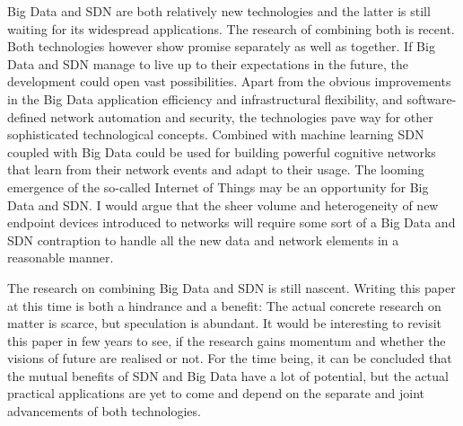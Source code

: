 \documentclass{acm_proc_article-sp}
\begin{document}
Big Data and SDN are both relatively new technologies and the latter is still waiting for its widespread applications. The research of combining both is recent. Both technologies however show promise separately as well as together. If Big Data and SDN manage to live up to their expectations in the future, the development could open vast possibilities. Apart from the obvious improvements in the Big Data application efficiency and infrastructural flexibility, and software-defined network automation and security, the technologies pave way for other sophisticated technological concepts. Combined with machine learning SDN coupled with Big Data could be used for building powerful cognitive networks that learn from their network events and adapt to their usage. The looming emergence of the so-called Internet of Things may be an opportunity for Big Data and SDN. I would argue that the sheer volume and heterogeneity of new endpoint devices introduced to networks will require some sort of a Big Data and SDN contraption to handle all the new data and network elements in a reasonable manner.

The research on combining Big Data and SDN is still nascent. Writing this paper at this time is both a hindrance and a benefit: The actual concrete research on matter is scarce, but speculation is abundant. It would be interesting to revisit this paper in few years to see, if the research gains momentum and whether the visions of future are realised or not. For the time being, it can be concluded that the mutual benefits of SDN and Big Data have a lot of potential, but the actual practical applications are yet to come and depend on the separate and joint advancements of both technologies.



\end{document}
